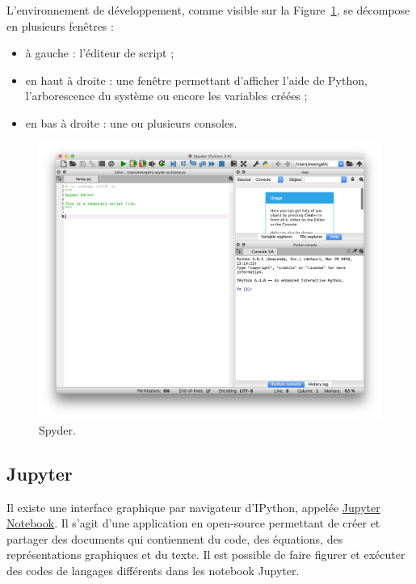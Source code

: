 \documentclass[12pt,]{book}
\providecommand{\tightlist}{%
  \setlength{\itemsep}{0pt}\setlength{\parskip}{0pt}}
\numberwithin{equation}{section}
\numberwithin{countremarque}{section}
\begin{document}
L'environnement de développement, comme visible sur la
Figure~\ref{fig:intro-spyder}, se décompose en plusieurs fenêtres :

\begin{itemize}
\tightlist
\item
  à gauche : l'éditeur de script ;
\item
  en haut à droite : une fenêtre permettant d'afficher l'aide de Python,
  l'arborescence du système ou encore les variables créées ;
\item
  en bas à droite : une ou plusieurs consoles.
\end{itemize}

\begin{figure}[H]

{\centering \includegraphics[width=1\linewidth]{figs/spyder} 

}

\caption{Spyder.}\label{fig:intro-spyder}
\end{figure}

\subsection{Jupyter}\label{jupyter}

Il existe une interface graphique par navigateur d'IPython, appelée
\href{http://jupyter.org/}{Jupyter Notebook}. Il s'agit d'une
application en open-source permettant de créer et partager des documents
qui contiennent du code, des équations, des représentations graphiques
et du texte. Il est possible de faire figurer et exécuter des codes de
langages différents dans les notebook Jupyter.
\end{document}

